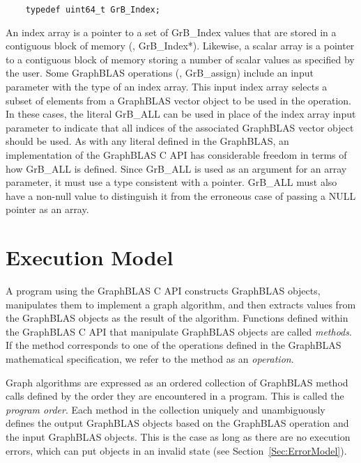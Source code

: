 \begin{verbatim}
    typedef uint64_t GrB_Index;
\end{verbatim}

An index array is a pointer to a set of {\sf GrB\_Index} values that are 
stored in a contiguous block of memory (\ie, {\sf GrB\_Index*}).
Likewise, a scalar array is a pointer to a contiguous block of memory 
storing a number of scalar values as specified by the user.
Some GraphBLAS operations (\eg, {\sf GrB\_assign})  include an input parameter with the type of an index array. 
This input index array selects a subset of elements from a GraphBLAS vector object to be used in the operation.
In these cases, the literal {\sf GrB\_ALL} 
can be used in place of the index array input parameter to indicate that all indices 
of the associated GraphBLAS vector object should be used.
As with any literal defined in the GraphBLAS, an implementation of the GraphBLAS C API has considerable 
freedom in terms of how {\sf GrB\_ALL} is defined.  Since {\sf GrB\_ALL} is used as an argument for an array 
parameter, it must use a type consistent with a pointer. {\sf GrB\_ALL} must also have a non-null
value to distinguish it from the erroneous case of passing a {\sf NULL} pointer as an array.

\section{Execution Model}
\label{Sec:ExecutionModel}

A program using the GraphBLAS C API constructs GraphBLAS objects,
manipulates them to implement a graph algorithm, and then extracts
values from the GraphBLAS objects as the result of the algorithm.
Functions defined within the GraphBLAS C API that manipulate GraphBLAS
objects are called \emph{methods}.  If the method corresponds to one
of the operations defined in the GraphBLAS mathematical specification,
we refer to the method as an \emph{operation}.

Graph algorithms are expressed as an ordered collection of GraphBLAS
method calls defined by the order they are encountered in a program.
This is called the \emph{program order}.  Each method in the collection
uniquely and unambiguously defines the output GraphBLAS objects based
on the GraphBLAS operation and the input GraphBLAS objects. This is the
case as long as there are no execution errors, which can put objects in
an invalid state (see Section~\ref{Sec:ErrorModel}).

